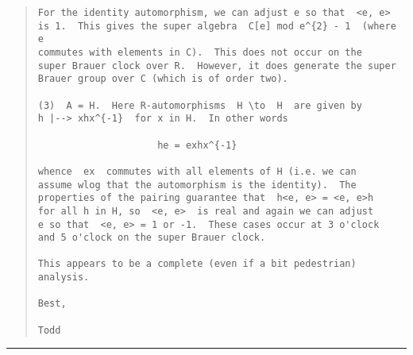 \begin{quote}
\begin{verbatim}
For the identity automorphism, we can adjust e so that  <e, e>
is 1.  This gives the super algebra  C[e] mod e^{2} - 1  (where e 
commutes with elements in C).  This does not occur on the 
super Brauer clock over R.  However, it does generate the super 
Brauer group over C (which is of order two). 
 
(3)  A = H.  Here R-automorphisms  H \to  H  are given by 
h |--> xhx^{-1}  for x in H.  In other words 
 
                     he = exhx^{-1}
 
whence  ex  commutes with all elements of H (i.e. we can 
assume wlog that the automorphism is the identity).  The 
properties of the pairing guarantee that  h<e, e> = <e, e>h 
for all h in H, so  <e, e>  is real and again we can adjust 
e so that  <e, e> = 1 or -1.  These cases occur at 3 o'clock 
and 5 o'clock on the super Brauer clock. 
 
This appears to be a complete (even if a bit pedestrian) 
analysis. 
 
Best, 
 
Todd
\end{verbatim}
    
\end{quote}




\par\noindent\rule{\textwidth}{0.4pt}
